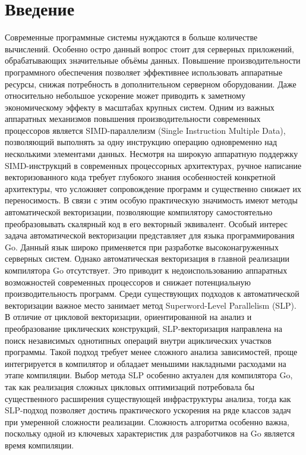 \section{Введение}
\label{sec:Chapter0} 

Современные программные системы нуждаются в больше количестве вычислений. Особенно остро данный вопрос стоит для серверных приложений, обрабатывающих значительные объёмы данных. Повышение производительности программного обеспечения позволяет эффективнее использовать аппаратные ресурсы, снижая потребность в дополнительном серверном оборудовании. Даже относительно небольшое ускорение может приводить к заметному экономическому эффекту в масштабах крупных систем.
Одним из важных аппаратных механизмов повышения производительности современных процессоров является SIMD-параллелизм (Single Instruction Multiple Data), позволяющий выполнять за одну инструкцию операцию одновременно над несколькими элементами данных. 
Несмотря на широкую аппаратную поддержку SIMD-инструкций в современных процессорных архитектурах, ручное написание векторизованного кода требует глубокого знания особенностей конкретной архитектуры,  что усложняет сопровождение программ и существенно снижает их переносимость. В связи с этим особую практическую значимость имеют методы автоматической векторизации, позволяющие компилятору самостоятельно преобразовывать скалярный код в его векторный эквивалент.
Особый интерес задача автоматической векторизации представляет для языка программирования Go. Данный язык широко применяется при разработке высоконагруженных серверных систем. Однако автоматическая векторизация в главной реализации компилятора Go отсутствует. Это приводит к недоиспользованию аппаратных возможностей современных процессоров и снижает потенциальную производительность программ.
Среди существующих подходов к автоматической векторизации важное место занимает метод Superword-Level Parallelism (SLP). В отличие от цикловой векторизации, ориентированной на анализ и преобразование циклических конструкций, SLP-векторизация направлена на поиск независимых однотипных операций внутри ациклических участков программы. Такой подход требует менее сложного анализа зависимостей, проще интегрируется в компилятор и обладает меньшими накладными расходами на этапе компиляции.
Выбор метода SLP особенно актуален для компилятора Go, так как реализация сложных цикловых оптимизаций потребовала бы существенного расширения существующей инфраструктуры анализа, тогда как SLP-подход позволяет достичь практического ускорения на ряде классов задач при умеренной сложности реализации. Сложность алгоритма особенно важна, поскольку одной из ключевых характеристик для разработчиков на Go является время компиляции.

